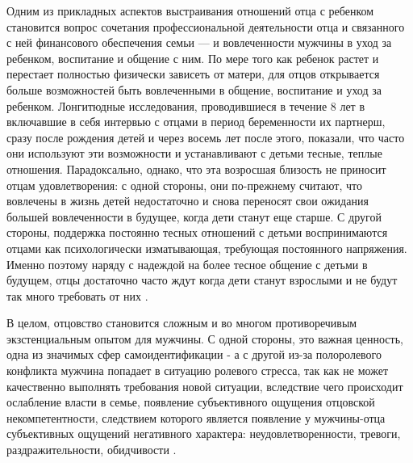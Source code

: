 \documentclass{../../common/thesisbyxetex}
\begin{document}
Одним из прикладных аспектов выстраивания отношений отца с ребенком становится вопрос сочетания
профессиональной деятельности отца и связанного с ней финансового обеспечения семьи --- и
вовлеченности мужчины в уход за ребенком,  воспитание и общение с ним. 
По мере того как ребенок растет и перестает полностью физически зависеть от матери, для отцов
открывается больше возможностей быть вовлеченными в общение, воспитание и уход за ребенком.
Лонгитюдные исследования, проводившиеся в течение 8 лет в включавшие в себя интервью с отцами
в период беременности их партнерш, сразу после рождения детей и через восемь лет после этого,
показали, что часто они используют эти возможности и устанавливают с детьми тесные, теплые
отношения. Парадоксально, однако, что эта возросшая близость не приносит отцам удовлетворения: с
одной стороны, они по-прежнему считают, что вовлечены в жизнь детей недостаточно и снова переносят
свои ожидания большей вовлеченности в будущее, когда дети станут еще старше. С другой стороны,
поддержка постоянно тесных отношений с детьми воспринимаются отцами как
психологически изматывающая, требующая постоянного напряжения. Именно поэтому наряду с надеждой
на более тесное общение с детьми в будущем, отцы достаточно часто
ждут когда дети станут взрослыми и не будут так много требовать от них \cite[22]{long}.

В целом, отцовство становится сложным и во многом противоречивым экзстенциальным опытом для
мужчины.
 С одной стороны, это важная ценность, одна из
значимых сфер самоидентификации - а с другой из-за полоролевого конфликта  мужчина попадает в
ситуацию ролевого стресса, так как не может
качественно выполнять требования новой ситуации, вследствие чего происходит
ослабление власти в семье, появление субъективного ощущения отцовской
некомпетентности, следствием которого является появление у мужчины-отца
субъективных ощущений негативного характера: неудовлетворенности, тревоги,
раздражительности, обидчивости \cite[111]{confl}.





\end{document}
